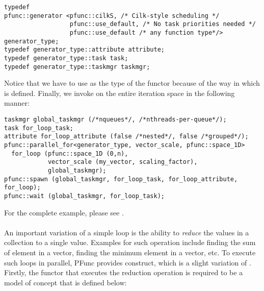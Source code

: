 \begin{center}
\begin{minipage}{0.8\textwidth}
\begin{lstlisting}
typedef 
pfunc::generator <pfunc::cilkS, /* Cilk-style scheduling */
                  pfunc::use_default, /* No task priorities needed */
                  pfunc::use_default /* any function type*/> generator_type;
typedef generator_type::attribute attribute;
typedef generator_type::task task;
typedef generator_type::taskmgr taskmgr;
\end{lstlisting}
\end{minipage}
\end{center}
%
Notice that we have to use  as the type of the functor
because of the way in which  is defined.
%
Finally, we invoke  on the entire iteration space in
the following manner:
\begin{center}
\begin{minipage}{0.7\textwidth}
\begin{lstlisting}
taskmgr global_taskmgr (/*nqueues*/, /*nthreads-per-queue*/);
task for_loop_task;
attribute for_loop_attribute (false /*nested*/, false /*grouped*/);
pfunc::parallel_for<generator_type, vector_scale, pfunc::space_1D> 
  for_loop (pfunc::space_1D (0,n), 
            vector_scale (my_vector, scaling_factor), 
            global_taskmgr);
pfunc::spawn (global_taskmgr, for_loop_task, for_loop_attribute, for_loop);
pfunc::wait (global_taskmgr, for_loop_task);
\end{lstlisting}
\end{minipage}
\end{center}
%
For the complete example, please see .

\paragraph{} An important variation of a simple 
 loop is the ability to \textit{reduce} the values in a collection
to a single value.
%
Examples for such operation include finding the sum of element in a vector, 
finding the minimum element in a vector, etc.
%
To execute such loops in parallel, PFunc provides  
construct, which is a slight variation of .
%
Firstly, the functor that executes the reduction operation is required to be
a model of  concept that is defined below:

